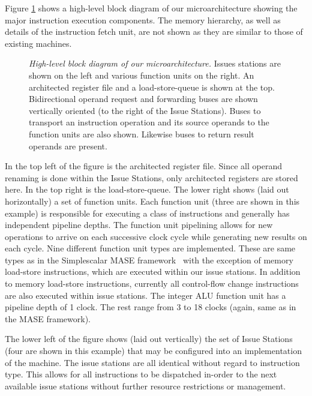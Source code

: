 \documentclass[10pt,dvips]{article}
\begin{document}
Figure \ref{fig:overview} shows a high-level block diagram
of our microarchitecture showing the major instruction execution components.
The memory hierarchy, as well as details of the instruction fetch
unit, are not shown as they are similar to those of existing
machines.
%
\begin{figure}
\centering
\scriptsize {
}
\caption{{\em High-level block diagram of our microarchitecture.} 
Issues stations are shown on the left and various function
units on the right.  An architected register file and a
load-store-queue is shown at the top.
Bidirectional operand request and forwarding buses are shown
vertically oriented (to the right of the Issue Stations).
Buses to transport an instruction operation and its source operands
to the function units are also shown. 
Likewise buses to return result operands are present.}
\label{fig:overview}
\end{figure}
%
In the top left of the figure is the architected register file.
Since all operand renaming is done within the Issue Stations,
only architected registers are stored here.
In the top right is the load-store-queue.
The lower right shows (laid out horizontally) a set of function units.
Each function unit (three are shown in this example)
is responsible for executing a class of
instructions and generally has independent pipeline depths.
The function unit pipelining allows for new operations to arrive
on each successive clock cycle while generating new results on
each cycle.
Nine different function unit types are implemented.
These are same types as in
the Simplescalar MASE framework~\cite{Austin97} with the
exception of memory load-store instructions, which are executed within our
issue stations.
In addition to memory load-store instructions, currently
all control-flow change instructions are also executed within
issue stations.
The integer ALU function unit has a pipeline depth of 1 clock.
The rest range from 3 to 18 clocks (again, same as in the MASE
framework).

The lower left of the figure shows (laid out vertically) the set of
Issue Stations (four are shown in this example)
that may be configured into an implementation of
the machine.
The issue stations are all identical without regard to 
instruction type.  This allows for all instructions to be
dispatched in-order to the next available issue stations 
without further resource restrictions or management.
\end{document}
